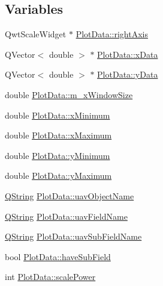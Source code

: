 \subsection*{\-Variables}
\begin{DoxyCompactItemize}
\item 
\-Qwt\-Scale\-Widget $\ast$ \hyperlink{group___scope_plugin_gad0b4661f32046ccf0ab49100be76c1b3}{\-Plot\-Data\-::right\-Axis}
\item 
\-Q\-Vector$<$ double $>$ $\ast$ \hyperlink{group___scope_plugin_ga6232b3f635142b1b11f283491a01b719}{\-Plot\-Data\-::x\-Data}
\item 
\-Q\-Vector$<$ double $>$ $\ast$ \hyperlink{group___scope_plugin_ga0544d6bcbe24fc0bb460123547821457}{\-Plot\-Data\-::y\-Data}
\item 
double \hyperlink{group___scope_plugin_gaf008f7f617cf48b623abbd095e483e10}{\-Plot\-Data\-::m\-\_\-x\-Window\-Size}
\item 
double \hyperlink{group___scope_plugin_ga2115389376ac088ccc03fcb8a2279f8a}{\-Plot\-Data\-::x\-Minimum}
\item 
double \hyperlink{group___scope_plugin_ga8d380f3d20ca5102bd641b5475238da6}{\-Plot\-Data\-::x\-Maximum}
\item 
double \hyperlink{group___scope_plugin_gabb9422e4f6ced646443b98b6b4304957}{\-Plot\-Data\-::y\-Minimum}
\item 
double \hyperlink{group___scope_plugin_gaf9ae404a5b9a749189b4cba112eb5c18}{\-Plot\-Data\-::y\-Maximum}
\item 
\hyperlink{group___u_a_v_objects_plugin_gab9d252f49c333c94a72f97ce3105a32d}{\-Q\-String} \hyperlink{group___scope_plugin_ga409edd318f86291f5b46a673ff67e7fb}{\-Plot\-Data\-::uav\-Object\-Name}
\item 
\hyperlink{group___u_a_v_objects_plugin_gab9d252f49c333c94a72f97ce3105a32d}{\-Q\-String} \hyperlink{group___scope_plugin_ga3b137cdb062886f986237f8c9b527c22}{\-Plot\-Data\-::uav\-Field\-Name}
\item 
\hyperlink{group___u_a_v_objects_plugin_gab9d252f49c333c94a72f97ce3105a32d}{\-Q\-String} \hyperlink{group___scope_plugin_ga22ac4a688fa35def44e941b82b0a0b60}{\-Plot\-Data\-::uav\-Sub\-Field\-Name}
\item 
bool \hyperlink{group___scope_plugin_ga75814d7f770a1a8348f39dc7ca4bdb8f}{\-Plot\-Data\-::have\-Sub\-Field}
\item 
int \hyperlink{group___scope_plugin_gad4b115ab449c4276ef15d3e2862e6280}{\-Plot\-Data\-::scale\-Power}
\item 

\end{DoxyCompactItemize}
